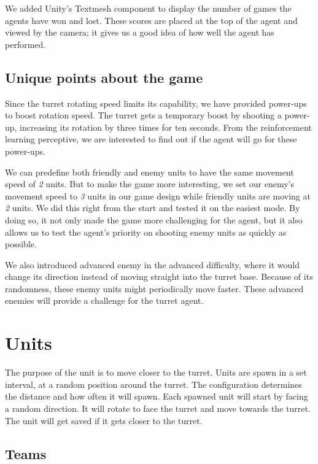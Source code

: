 \documentclass[conference]{IEEEtran}
\begin{document}
We added Unity's Textmesh component to display the number of games the agents have won and lost. These scores are placed at the top of the agent and viewed by the camera; it gives us a good idea of how well the agent has performed.

\subsection{Unique points about the game}

Since the turret rotating speed limits its capability, we have provided power-ups to boost rotation speed. The turret gets a temporary boost by shooting a power-up, increasing its rotation by three times for ten seconds. From the reinforcement learning perceptive, we are interested to find out if the agent will go for these power-ups.

We can predefine both friendly and enemy units to have the same movement speed of \textit{2} units. But to make the game more interesting, we set our enemy's movement speed to \textit{3} units in our game design while friendly units are moving at \textit{2} units. We did this right from the start and tested it on the easiest mode. By doing so, it not only made the game more challenging for the agent, but it also allows us to test the agent's priority on shooting enemy units as quickly as possible.

We also introduced advanced enemy in the advanced difficulty, where it would change its direction instead of moving straight into the turret base. Because of its randomness, these enemy units might periodically move faster. These advanced enemies will provide a challenge for the turret agent.

\section{Units}

The purpose of the unit is to move closer to the turret. Units are spawn in a set interval, at a random position around the turret. The configuration determines the distance and how often it will spawn. Each spawned unit will start by facing a random direction. It will rotate to face the turret and move towards the turret. The unit will get saved if it gets closer to the turret.

\subsection{Teams}
\end{document}
